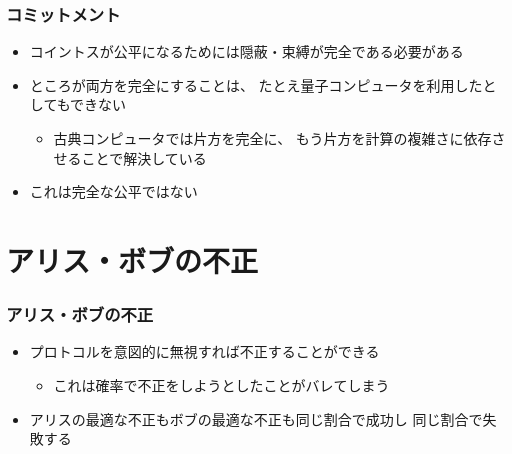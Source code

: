 \begin{frame}
  \frametitle{コミットメント}

  \begin{itemize}
    \item コイントスが公平になるためには隠蔽・束縛が完全である必要がある

    \item ところが両方を完全にすることは、
    たとえ量子コンピュータを利用したとしてもできない
    \begin{itemize}
      \item 古典コンピュータでは片方を完全に、
      もう片方を計算の複雑さに依存させることで解決している
    \end{itemize}
  \end{itemize}

  \begin{center}
  \end{center}

  \begin{itemize}
    \item これは完全な公平ではない
  \end{itemize}

  \begin{center}
  \end{center}
\end{frame}

\section{アリス・ボブの不正}

\begin{frame}
  \frametitle{アリス・ボブの不正}

  \begin{itemize}
    \item プロトコルを意図的に無視すれば不正することができる
    \begin{itemize}
      \item これは確率で不正をしようとしたことがバレてしまう
    \end{itemize}

    \item アリスの最適な不正もボブの最適な不正も同じ割合で成功し
    同じ割合で失敗する
  \end{itemize}


\end{frame}


